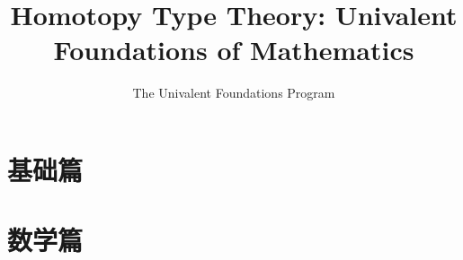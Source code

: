 \documentclass[\OPTfontsize]{book}
\begin{document}
\title{Homotopy Type Theory: Univalent Foundations of Mathematics}
\author{The Univalent Foundations Program}

\frontmatter %

\pagestyle{empty}


\cleartooddpage

\hypertarget{preface}{}

\pagestyle{fancyplain}



\cleartooddpage[\thispagestyle{empty}]

\hypertarget{toc}{}

\setcounter{tocdepth}{1}        %
\tableofcontents
\setcounter{tocdepth}{2}        %
\cleartooddpage[\thispagestyle{empty}]

\mainmatter %

\pagestyle{fancyplain}



\part{基础篇}
\label{part:foundations}















\cleartooddpage[\thispagestyle{empty}] %
\part{数学篇}
\label{part:mathematics}
\end{document}
